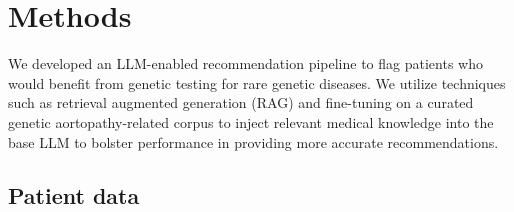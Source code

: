 \documentclass[fleqn,10pt]{wlscirep}
\begin{document}
\section*{Methods}

We developed an LLM-enabled recommendation pipeline to flag patients who would benefit from genetic testing for rare genetic diseases. We utilize techniques such as retrieval augmented generation (RAG) and fine-tuning on a curated genetic aortopathy-related corpus to inject relevant medical knowledge into the base LLM to bolster performance in providing more accurate recommendations.

\subsection*{Patient data}
\end{document}
